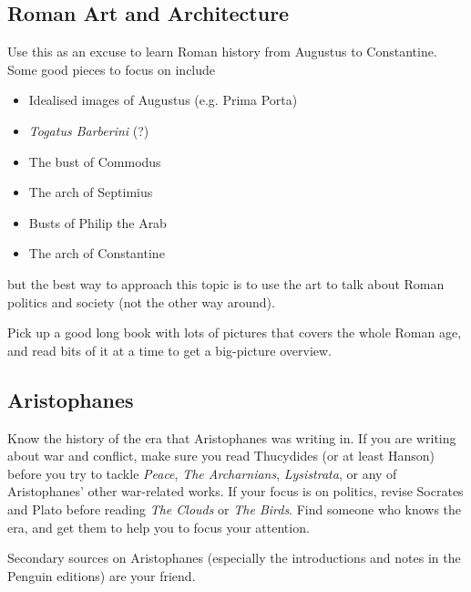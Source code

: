 \documentclass[a4paper,10pt]{article}
\begin{document}
\subsection{Roman Art and Architecture}
Use this as an excuse to learn Roman history from Augustus to Constantine. Some good pieces to focus on include
\begin{itemize}
  \item Idealised images of Augustus (e.g. Prima Porta)
  \item \textit{Togatus Barberini} (?)
  \item The bust of Commodus
  \item The arch of Septimius
  \item Busts of Philip the Arab
  \item The arch of Constantine
\end{itemize}
but the best way to approach this topic is to use the art to talk about Roman politics and society (not the other way around).

Pick up a good long book with lots of pictures that covers the whole Roman age, and read bits of it at a time to get a big-picture overview.

\subsection{Aristophanes}
Know the history of the era that Aristophanes was writing in. If you are writing about war and conflict, make sure you
read Thucydides (or at least Hanson) before you try to tackle \textit{Peace}, \textit{The Archarnians}, \textit{Lysistrata},
or any of Aristophanes' other war-related works. If your focus is on politics, revise Socrates and Plato before reading \textit{The Clouds}
or \textit{The Birds}. Find someone who knows the era, and get them to help you to focus your attention.

Secondary sources on Aristophanes (especially the introductions and notes in the Penguin editions) are your friend.
\end{document}

